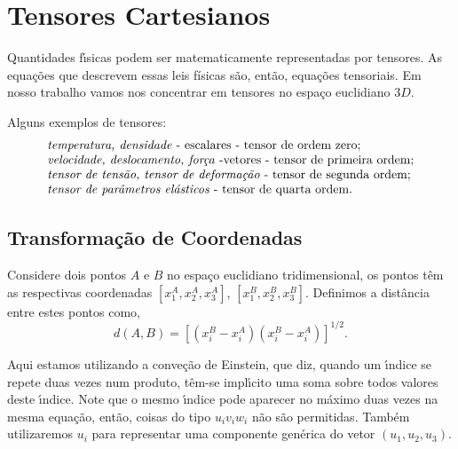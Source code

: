 \section{Tensores Cartesianos}

Quantidades f\'\i sicas podem ser matematicamente representadas
por tensores. As equa\c{c}\~oes que descrevem essas leis f\'isicas s\~ao, ent\~ao, equa\c{c}\~oes tensoriais.
Em nosso trabalho vamos nos concentrar em tensores no espa\c{c}o
euclidiano $3D$.

Alguns exemplos de tensores: \begin{equation}
  \begin{array}{l}
               \mbox{\emph{temperatura, densidade} - escalares - tensor de ordem zero}; \\
               \mbox{\emph{velocidade, deslocamento, for\c{c}a} -vetores - tensor de primeira ordem}; \\
               \mbox{\emph{tensor de tens\~ao, tensor de deforma\c{c}\~ao} - tensor de segunda ordem}; \\
               \mbox{\emph{tensor de par\^ametros el\'asticos} -  tensor de quarta ordem}. \\

\end{array}  
\end{equation}


\subsection{Transforma\c{c}\~ao de Coordenadas}

Considere dois pontos $A$ e $B$ no espa\c{c}o euclidiano tridimensional, os
pontos t\^em as respectivas coordenadas $[x_{1}^{A}, x_{2}^{A},
x_{3}^{A}]$, $[x_{1}^{B}, x_{2}^{B}, x_{3}^{B}]$. Definimos a
dist\^ancia entre estes pontos como,
\begin{equation}
d(A,B)=\left[(x_{i}^{B}-x_{i}^{A})(x_{i}^{B}-x_{i}^{A})\right]^{1/2}.
\end{equation}


Aqui estamos utilizando a conve\c{c}\~ao de Einstein, que diz,
quando um \'\i ndice se repete duas vezes num produto, t\^em-se
 impl\'\i cito uma soma sobre todos valores deste \'\i ndice.
 Note que o mesmo \'\i ndice pode aparecer no m\'aximo duas vezes na mesma equa\c{c}\~ao,
 ent\~ao, coisas do tipo $u_{i}v_{i}w_{i}$ n\~ao s\~ao permitidas.
Tamb\'em utilizaremos $u_{i}$ para representar uma componente gen\'erica do vetor $(u_{1},
u_{2}, u_{3})$.

